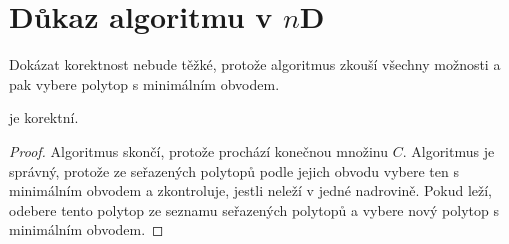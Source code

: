 \section{Důkaz algoritmu v \texorpdfstring{$n$D}{nD}}
\label{dukaz_algoritmu_nd}
Dokázat korektnost  nebude těžké, protože algoritmus zkouší všechny možnosti a pak vybere polytop s minimálním obvodem.
\begin{tvrzeni}
  \label{tvrzeni:algoritmus_nd}
   je korektní.
\end{tvrzeni}
\begin{proof}
\label{dukaz:algoritmus_nd}
Algoritmus skončí, protože prochází konečnou množinu $C$. Algoritmus je správ\-ný, protože ze seřazených polytopů podle jejich obvodu vybere ten s minimálním obvodem a zkontroluje, jestli neleží v jedné nadrovině. Pokud leží, odebere tento polytop ze seznamu seřazených polytopů a vybere nový polytop s minimálním obvodem.
\end{proof}